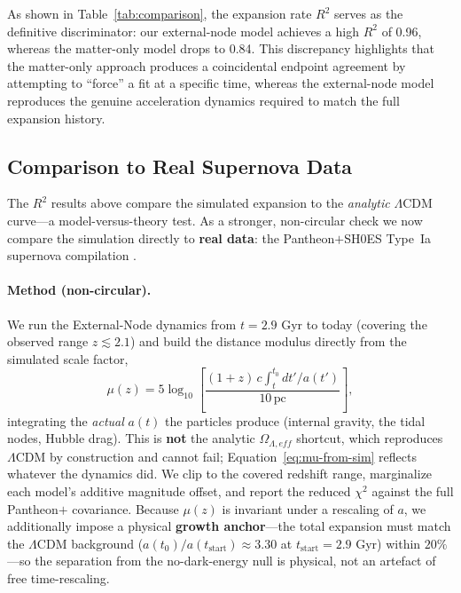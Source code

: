 \documentclass{article}
\begin{document}
As shown in Table~\ref{tab:comparison}, the expansion rate $R^2$ serves as the definitive discriminator: our external-node model achieves a high $R^2$ of 0.96, whereas the matter-only model drops to 0.84. This discrepancy highlights that the matter-only approach produces a coincidental endpoint agreement by attempting to ``force'' a fit at a specific time, whereas the external-node model reproduces the genuine acceleration dynamics required to match the full expansion history.

\subsection{Comparison to Real Supernova Data}
\label{sec:from-data}

The $R^2$ results above compare the simulated expansion to the \emph{analytic} $\Lambda$CDM curve---a model-versus-theory test. As a stronger, non-circular check we now compare the simulation directly to \textbf{real data}: the Pantheon$+$SH0ES Type~Ia supernova compilation \cite{Brout2022}.

\paragraph{Method (non-circular).}
We run the External-Node dynamics from $t = 2.9$ Gyr to today (covering the observed range $z \lesssim 2.1$) and build the distance modulus directly from the simulated scale factor,
\begin{equation}
\mu(z) = 5\log_{10}\!\left[\frac{(1+z)\,c\!\int_{t}^{t_0}\! dt'/a(t')}{10\,\mathrm{pc}}\right],
\label{eq:mu-from-sim}
\end{equation}
integrating the \emph{actual} $a(t)$ the particles produce (internal gravity, the tidal nodes, Hubble drag). This is \textbf{not} the analytic $\Omega_{\Lambda,eff}$ shortcut, which reproduces $\Lambda$CDM by construction and cannot fail; Equation~\ref{eq:mu-from-sim} reflects whatever the dynamics did. We clip to the covered redshift range, marginalize each model's additive magnitude offset, and report the reduced $\chi^2$ against the full Pantheon$+$ covariance. Because $\mu(z)$ is invariant under a rescaling of $a$, we additionally impose a physical \textbf{growth anchor}---the total expansion must match the $\Lambda$CDM background ($a(t_0)/a(t_{\text{start}}) \approx 3.30$ at $t_{\text{start}} = 2.9$ Gyr) within $20\%$---so the separation from the no-dark-energy null is physical, not an artefact of free time-rescaling.
\end{document}
